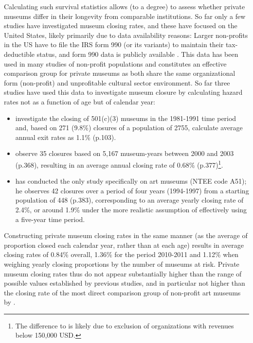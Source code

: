 \documentclass[12pt]{article}
\begin{document}
Calculating such survival statistics allows (to a degree) to assess whether private museums differ in their longevity from comparable institutions.
So far only a few studies have investigated museum closing rates, and these have focused on the United States, likely primarily due to data availability reasons: 
Larger non-profits in the US have to file the IRS form 990 (or its variants) to maintain their tax-deductible status, and form 990 data is publicly available \parencite{Lecy_2023_core}.
This data has been used in many studies of non-profit populations and constitutes an effective comparison group for private museums as both share the same organizational form (non-profit) and unprofitable cultural sector environment.
So far three studies have used this data to investigate museum closure by calculating hazard rates not as a function of age but of calendar year:
\begin{itemize}
\item \textcite{Bowen_etal_1994_charitable} investigate the closing of 501(c)(3) museums in the 1981-1991 time period and, based on 271 (9.8\%) closures of a population of 2755, calculate average annual exit rates as 1.1\% (p.103).
\item \textcite{Gordon_etal_2013_insolvency} observe 35 closures based on 5,167 museum-years between 2000 and 2003 (p.368), resulting in an average annual closing rate of 0.68\% (p.377)\footnote{The difference to \cite{Bowen_etal_1994_charitable} is likely due to exclusion of organizations with revenues below 150,000 USD.}.
\item \textcite{Hager_2001_vulnerability} has conducted the only study specifically on art museums (NTEE code A51); he observes 42 closures over a period of four years (1994-1997) from a starting population of 448 (p.383), corresponding to an average yearly closing rate of 2.4\%, or around 1.9\% under the more realistic assumption of effectively using a five-year time period.
\end{itemize}

Constructing private museum closing rates in the same manner (as the average of proportion closed each calendar year, rather than at each age) results in average closing rates of 0.84\% overall, 1.36\% for the period 2010-2011 and 1.12\% when weighing yearly closing proportions by the number of museums at risk.
Private museum closing rates thus do not appear substantially higher than the range of possible values established by previous studies, and in particular not higher than the closing rate of the most direct comparison group of non-profit art museums by \textcite{Hager_2001_vulnerability}. 
\end{document}
